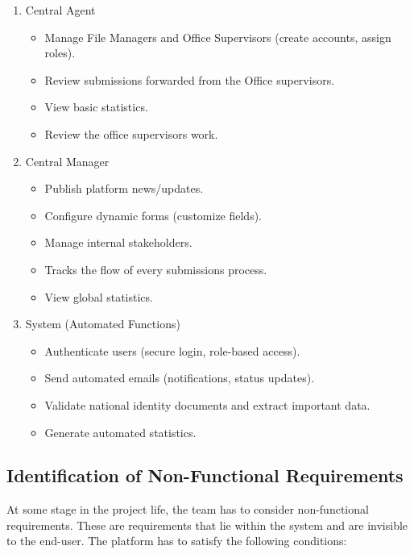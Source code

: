 \begin{enumerate}
\item Central Agent
\begin{itemize}
    \item Manage File Managers and Office Supervisors (create accounts, assign roles).
    \item Review submissions forwarded from the Office supervisors.
    \item View basic statistics.
    \item Review the office supervisors work.
\end{itemize}

\item Central Manager
\begin{itemize}
    \item Publish platform news/updates.
    \item Configure dynamic forms (customize fields).
    \item Manage internal stakeholders.
    \item Tracks the flow of every submissions process.
    \item View global statistics.
\end{itemize}
    
\item System (Automated Functions)

\begin{itemize}
    \item Authenticate users (secure login, role-based access).
    \item Send automated emails (notifications, status updates).
    \item Validate national identity documents and extract important data.
    \item Generate automated statistics.
\end{itemize}
\end{enumerate}
\subsection{Identification of Non-Functional Requirements}
At some stage in the project life, the team has to consider non-functional requirements. These are requirements that lie within the system and are invisible to the end-user. The platform has to satisfy the following conditions:


